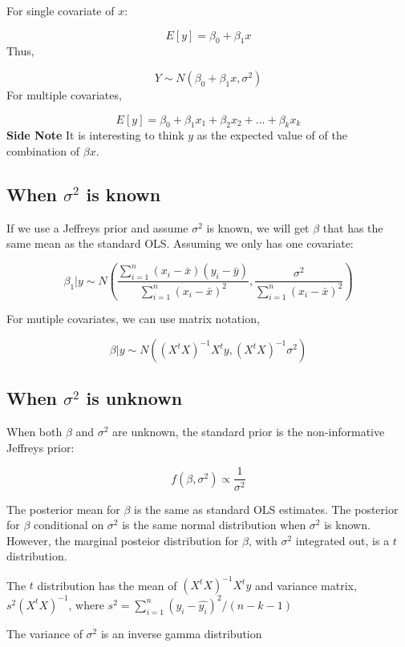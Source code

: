 \documentclass[]{book}
\begin{document}
For single covariate of \(x\):

\[E[y]=\beta_0+\beta_1 x\]
Thus,

\[Y \sim N(\beta_0+\beta_1 x, \sigma^2)\]
For multiple covariates,

\[E[y]=\beta_0+\beta_1 x_1+\beta_2 x_2 + ...+ \beta_kx_k\]
\textbf{Side Note}
It is interesting to think \(y\) as the expected value of of the combination of \(\beta x\).

\hypertarget{when-sigma2-is-known}{%
\subsection{\texorpdfstring{When \(\sigma^2\) is known}{When \textbackslash{}sigma\^{}2 is known}}\label{when-sigma2-is-known}}

If we use a Jeffreys prior and assume \(\sigma^2\) is known, we will get \(\beta\) that has the same mean as the standard OLS. Assuming we only has one covariate:

\[\beta_1|y \sim N(\frac{\sum_{i=1}^n (x_i-\bar{x})(y_i-\bar{y})}{\sum_{i=1}^n(x_i-\bar{x})^2},\frac{\sigma^2}{\sum_{i=1}^n(x_i-\bar{x})^2})\]

For mutiple covariates, we can use matrix notation,

\[\beta|y \sim N((X^tX)^{-1}X^ty,(X^tX)^{-1}\sigma^2)\]

\hypertarget{when-sigma2-is-unknown}{%
\subsection{\texorpdfstring{When \(\sigma^2\) is unknown}{When \textbackslash{}sigma\^{}2 is unknown}}\label{when-sigma2-is-unknown}}

When both \(\beta\) and \(\sigma^2\) are unknown, the standard prior is the non-informative Jeffreys prior:

\[f(\beta, \sigma^2) \propto \frac{1}{\sigma^2}\]

The posterior mean for \(\beta\) is the same as standard OLS estimates. The posterior for \(\beta\) conditional on \(\sigma^2\) is the same normal distribution when \(\sigma^2\) is known. However, the marginal posteior distribution for \(\beta\), with \(\sigma^2\) integrated out, is a \(t\) distribution.

The \(t\) distribution has the mean of \((X^tX)^{-1}X^ty\) and variance matrix, \(s^2(X^tX)^{-1}\), where \(s^2=\sum_{i=1}^n(y_i-\hat{y_i})^2/(n-k-1)\)

The variance of \(\sigma^2\) is an inverse gamma distribution
\end{document}
